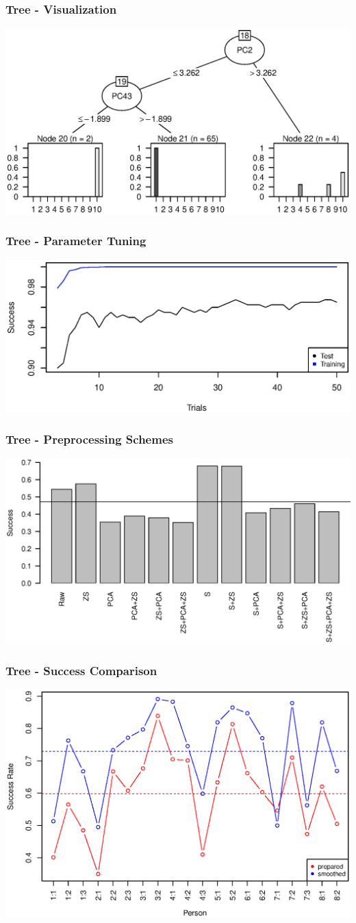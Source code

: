 
\begin{frame}
\frametitle{Tree - Visualization}
\includegraphics[width = 0.9 \textwidth]{graphics/tree_section}
\end{frame}

\begin{frame}
\frametitle{Tree - Parameter Tuning}
\includegraphics[width = 0.9 \textwidth]{graphics/tree_boost_overfitting}
\end{frame}

\begin{frame}
\frametitle{Tree - Preprocessing Schemes}
\includegraphics[width = 0.9 \textwidth]{graphics/tree_total_all}
\end{frame}

\begin{frame}
\frametitle{Tree - Success Comparison}
\includegraphics[width = 0.9 \textwidth]{graphics/tree_performance_all_combined}
\end{frame}
